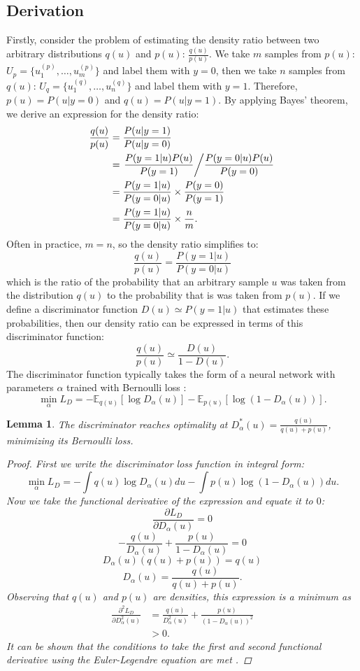 \documentclass[honours,12pt]{unswthesis}
\newcommand{\E}{\mathbb{E}}
\newtheorem{lemma}[theorem]{Lemma}
\numberwithin{equation}{section}
\theoremstyle{definition}
\begin{document}
\subsection{Derivation}
Firstly, consider the problem of estimating the density ratio between two arbitrary distributions $q(u)$ and $p(u)$: $\frac{q(u)}{p(u)}$. We take $m$ samples from $p(u)$: $U_p=\{u_1^{(p)},\dots,u_m^{(p)}\}$
and label them with $y=0$, then we take $n$ samples from $q(u)$: $U_q=\{u_1^{(q)},\dots, u_n^{(q)}\}$ and label them with $y=1$. Therefore, $p(u)=P(u|y=0)$ and $q(u)=P(u|y=1)$. By applying Bayes' theorem, we derive an expression for the density ratio:
\begin{align*}
\frac{q(u)}{p(u)}&= \frac{P(u|y=1)}{P(u|y=0)}\\
&= \left.\frac{P(y=1|u)P(u)}{P(y=1)}\middle/ \frac{P(y=0|u)P(u)}{P(y=0)}\right.\\
&= \frac{P(y=1|u)}{P(y=0|u)}\times \frac{P(y=0)}{P(y=1)}\\
&= \frac{P(y=1|u)}{P(y=0|u)}\times \frac{n}{m}.
\end{align*}
Often in practice, $m=n$, so the density ratio simplifies to:
\[\frac{q(u)}{p(u)}=\frac{P(y=1|u)}{P(y=0|u)}\]
which is the ratio of the probability that an arbitrary sample $u$ was taken from the distribution $q(u)$ to the probability that is was taken from $p(u)$. If we define a discriminator function $D(u)\simeq P(y=1|u)$ that estimates these probabilities, then our density ratio can be expressed in terms of this discriminator function:
\[\frac{q(u)}{p(u)}\simeq \frac{D(u)}{1-D(u)}.\]
The discriminator function typically takes the form of a neural network with parameters $\alpha$ trained with Bernoulli loss \citep{sugiyama}:
\[\min_\alpha L_D=-\E_{q(u)}[\log D_\alpha(u)]-\E_{p(u)}[\log(1-D_\alpha(u))].\]
\begin{lemma}
The discriminator reaches optimality at $D^*_\alpha(u)=\frac{q(u)}{q(u)+p(u)}$, minimizing its Bernoulli loss\citep{gan}.
\begin{proof}
First we write the discriminator loss function in integral form:
\[\min_\alpha L_D=-\int q(u)\log D_\alpha(u)du-\int p(u)\log(1-D_\alpha(u))du.\]
Now we take the functional derivative of the expression and equate it to $0$:
\[\frac{\partial L_D}{\partial D_\alpha(u)}=0\]
\[-\frac{q(u)}{D_\alpha(u)}+\frac{p(u)}{1-D_\alpha(u)}=0\]
\[D_\alpha(u)(q(u)+p(u))=q(u)\]
\[D_\alpha(u)=\frac{q(u)}{q(u)+p(u)}.\]
Observing that $q(u)$ and $p(u)$ are densities, this expression is a minimum as
\begin{align*}
\frac{\partial^2L_D}{\partial D^2_\alpha(u)}&=\frac{q(u)}{D^2_\alpha(u)}+\frac{p(u)}{(1-D_\alpha(u))^2}\\
&>0.
\end{align*}
It can be shown that the conditions to take the first and second functional derivative using the Euler-Legendre equation are met \citep{pattern}.
\end{proof}
\end{lemma}
\end{document}
